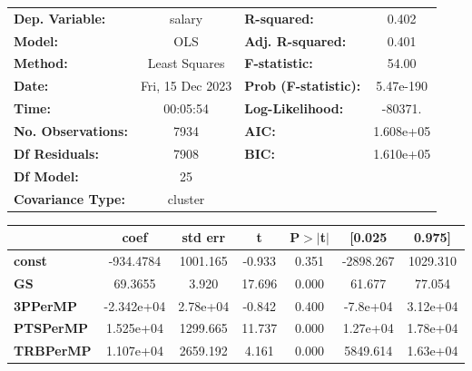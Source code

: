 \begin{center}
\begin{tabular}{lclc}
\toprule
\textbf{Dep. Variable:}             &      salary      & \textbf{  R-squared:         } &     0.402   \\
\textbf{Model:}                     &       OLS        & \textbf{  Adj. R-squared:    } &     0.401   \\
\textbf{Method:}                    &  Least Squares   & \textbf{  F-statistic:       } &     54.00   \\
\textbf{Date:}                      & Fri, 15 Dec 2023 & \textbf{  Prob (F-statistic):} & 5.47e-190   \\
\textbf{Time:}                      &     00:05:54     & \textbf{  Log-Likelihood:    } &   -80371.   \\
\textbf{No. Observations:}          &        7934      & \textbf{  AIC:               } & 1.608e+05   \\
\textbf{Df Residuals:}              &        7908      & \textbf{  BIC:               } & 1.610e+05   \\
\textbf{Df Model:}                  &          25      & \textbf{                     } &             \\
\textbf{Covariance Type:}           &     cluster      & \textbf{                     } &             \\
\bottomrule
\end{tabular}
\begin{tabular}{lcccccc}
                                    & \textbf{coef} & \textbf{std err} & \textbf{t} & \textbf{P$> |$t$|$} & \textbf{[0.025} & \textbf{0.975]}  \\
\midrule
\textbf{const}                      &    -934.4784  &     1001.165     &    -0.933  &         0.351        &    -2898.267    &     1029.310     \\
\textbf{GS}                         &      69.3655  &        3.920     &    17.696  &         0.000        &       61.677    &       77.054     \\
\textbf{3PPerMP}                    &   -2.342e+04  &     2.78e+04     &    -0.842  &         0.400        &     -7.8e+04    &     3.12e+04     \\
\textbf{PTSPerMP}                   &    1.525e+04  &     1299.665     &    11.737  &         0.000        &     1.27e+04    &     1.78e+04     \\
\textbf{TRBPerMP}                   &    1.107e+04  &     2659.192     &     4.161  &         0.000        &     5849.614    &     1.63e+04     \\

\end{tabular}
\end{center}
